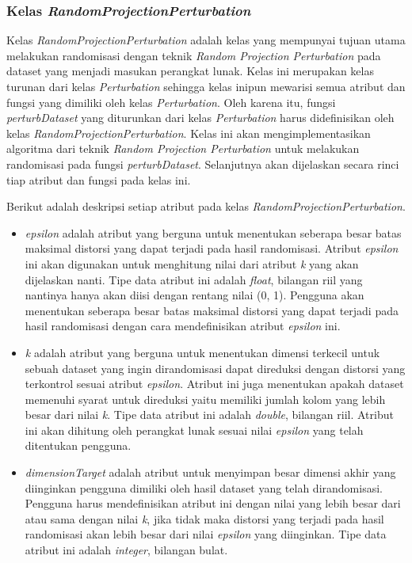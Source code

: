 \subsubsection{Kelas \textit{RandomProjectionPerturbation}}
\label{subsubsec:kelas-rpp}

Kelas \textit{RandomProjectionPerturbation} adalah kelas yang mempunyai tujuan utama melakukan randomisasi dengan teknik \textit{Random Projection Perturbation} pada dataset yang menjadi masukan perangkat lunak. Kelas ini merupakan kelas turunan dari kelas \textit{Perturbation} sehingga kelas inipun mewarisi semua atribut dan fungsi yang dimiliki oleh kelas \textit{Perturbation}. Oleh karena itu, fungsi \textit{perturbDataset} yang diturunkan dari kelas \textit{Perturbation} harus didefinisikan oleh kelas \textit{RandomProjectionPerturbation}. Kelas ini akan mengimplementasikan algoritma dari teknik \textit{Random Projection Perturbation} untuk melakukan randomisasi pada fungsi \textit{perturbDataset}. Selanjutnya akan dijelaskan secara rinci tiap atribut dan fungsi pada kelas ini.

Berikut adalah deskripsi setiap atribut pada kelas \textit{RandomProjectionPerturbation}.
\begin{itemize}
	\item \textit{epsilon} adalah atribut yang berguna untuk menentukan seberapa besar batas maksimal distorsi yang dapat terjadi pada hasil randomisasi. Atribut \textit{epsilon} ini akan digunakan untuk menghitung nilai dari atribut \textit{k} yang akan dijelaskan nanti. Tipe data atribut ini adalah \textit{float}, bilangan riil yang nantinya hanya akan diisi dengan rentang nilai (0, 1). Pengguna akan menentukan seberapa besar batas maksimal distorsi yang dapat terjadi pada hasil randomisasi dengan cara mendefinisikan atribut \textit{epsilon} ini.
	\item \textit{k} adalah atribut yang berguna untuk menentukan dimensi terkecil untuk sebuah dataset yang ingin dirandomisasi dapat direduksi dengan distorsi yang terkontrol sesuai atribut \textit{epsilon}. Atribut ini juga menentukan apakah dataset memenuhi syarat untuk direduksi yaitu memiliki jumlah kolom yang lebih besar dari nilai \textit{k}. Tipe data atribut ini adalah \textit{double}, bilangan riil. Atribut ini akan dihitung oleh perangkat lunak sesuai nilai \textit{epsilon} yang telah ditentukan pengguna.
	\item \textit{dimensionTarget} adalah atribut untuk menyimpan besar dimensi akhir yang diinginkan pengguna dimiliki oleh hasil dataset yang telah dirandomisasi. Pengguna harus mendefinisikan atribut ini dengan nilai yang lebih besar dari atau sama dengan nilai \textit{k}, jika tidak maka distorsi yang terjadi pada hasil randomisasi akan lebih besar dari nilai \textit{epsilon} yang diinginkan. Tipe data atribut ini adalah \textit{integer}, bilangan bulat.
\end{itemize}

